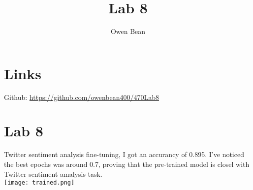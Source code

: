 \documentclass{article}
\title{Lab 8}
\author{Owen Bean}
\begin{document}
\maketitle


\section{Links}

Github: \href{https://github.com/owenbean400/470Lab8}{https://github.com/owenbean400/470Lab8} \\

\section{Lab 8}

Twitter sentiment analysis fine-tuning, I got an accurancy of 0.895. I've noticed the best epochs was around 0.7, proving that the pre-trained model is closel with Twitter sentiment amalysis task. \\

\texttt{[image: trained.png]}
\end{document}
